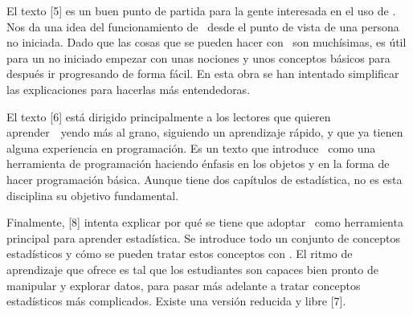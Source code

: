 El texto [5] es un buen punto de partida para la gente interesada en el uso de \Rt. Nos da una idea del funcionamiento de \Rt\ desde el punto de vista de una persona no iniciada. Dado que las cosas que se pueden hacer con \Rt\ son muchísimas, es útil para un no iniciado empezar con unas nociones y unos conceptos básicos para después ir progresando de forma fácil. En esta obra se han intentado simplificar las explicaciones para hacerlas más entendedoras.

El texto [6] está dirigido principalmente a los lectores que quieren aprender~\Rt\ yendo más al grano, siguiendo un aprendizaje rápido, y que ya tienen alguna experiencia en programación. Es un texto que introduce \Rt\ como una herramienta de programación haciendo énfasis en los objetos y en la forma de hacer programación básica. Aunque tiene dos capítulos de estadística, no es esta disciplina su objetivo fundamental.

Finalmente, [8] intenta explicar por qué se tiene que adoptar \Rt\ como herramienta principal para aprender estadística. Se introduce todo un conjunto de conceptos estadísticos y cómo se pueden tratar estos conceptos con \Rt. El ritmo de aprendizaje que ofrece es tal que los estudiantes son capaces bien pronto de manipular y explorar datos, para pasar más adelante a tratar conceptos estadísticos más complicados. Existe una versión reducida y libre [7].

